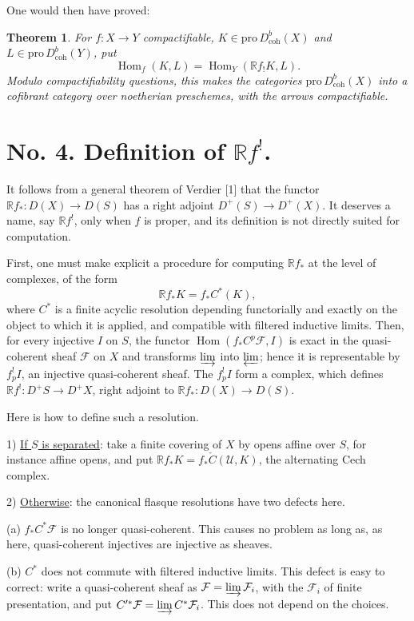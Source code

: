 \documentclass[12pt]{amsart}
\theoremstyle{plain}
\newtheorem{thm}{Theorem}
\theoremstyle{definition}
\DeclareMathOperator{\Hom}{Hom}
\newcommand{\Pro}{\text{pro}\,}
\newcommand{\coh}{\text{coh}}
\newcommand{\cF}{\mathcal{F}}
\newcommand{\cU}{\mathcal{U}}
\newcommand{\cDb}{D^{b}}
\newcommand{\cD}{D}
\newcommand{\bR}{\mathbb{R}}
\begin{document}
One would then have proved:

\begin{thm}
For $f:X\to Y$ compactifiable, $K\in\Pro\cDb_{\coh}(X)$ and $L\in\Pro\cDb_{\coh}(Y)$, put
\[
\Hom_f(K,L)=\Hom_Y(\bR f_!K,L).
\]
Modulo compactifiability questions, this makes the categories $\Pro\cDb_{\coh}(X)$ into a cofibrant category over noetherian preschemes, with the arrows compactifiable.
\end{thm}

\section*{No. 4. Definition of $\bR f^!$.}

It follows from a general theorem of Verdier [1] that the functor $\bR f_*:\cD(X)\to\cD(S)$ has a right adjoint $\cD^+(S)\to\cD^+(X)$. It deserves a name, say $\bR f^!$, only when $f$ is proper, and its definition is not directly suited for computation.

First, one must make explicit a procedure for computing $\bR f_*$ at the level of complexes, of the form
\[
\bR f_*K=f_*C^*(K),
\]
where $C^*$ is a finite acyclic resolution depending functorially and exactly on the object to which it is applied, and compatible with filtered inductive limits. Then, for every injective $I$ on $S$, the functor $\Hom(f_*C^p\cF,I)$ is exact in the quasi-coherent sheaf $\cF$ on $X$ and transforms $\varinjlim$ into $\varprojlim$; hence it is representable by $f_p^!I$, an injective quasi-coherent sheaf. The $f_p^!I$ form a complex, which defines $\bR f^!:\cD^+S\to\cD^+X$, right adjoint to $\bR f_*:\cD(X)\to\cD(S)$.

Here is how to define such a resolution.

1) \underline{If $S$ is separated}: take a finite covering of $X$ by opens affine over $S$, for instance affine opens, and put $\bR f_*K=f_*\check C(\cU,K)$, the alternating Cech complex.

2) \underline{Otherwise}: the canonical flasque resolutions have two defects here.

(a) $f_*C^*\cF$ is no longer quasi-coherent. This causes no problem as long as, as here, quasi-coherent injectives are injective as sheaves.

(b) $C^*$ does not commute with filtered inductive limits. This defect is easy to correct: write a quasi-coherent sheaf as $\cF=\varinjlim\cF_i$, with the $\cF_i$ of finite presentation, and put $C'^*\cF=\varinjlim C^*\cF_i$. This does not depend on the choices.
\end{document}
